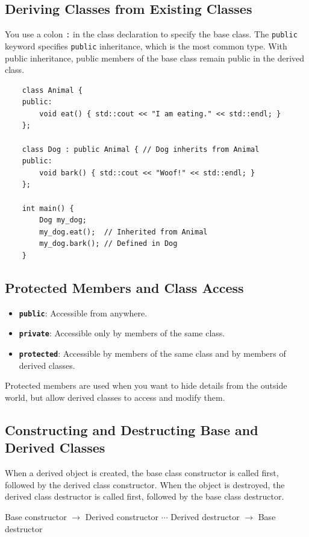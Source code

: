 \subsection{Deriving Classes from Existing Classes}
You use a colon \texttt{:} in the class declaration to specify the base class. The \texttt{public} keyword specifies \texttt{public} inheritance, which is the most common type. With public inheritance, public members of the base class remain public in the derived class.
\begin{lstlisting}
	class Animal {
	public:
		void eat() { std::cout << "I am eating." << std::endl; }
	};

	class Dog : public Animal { // Dog inherits from Animal
	public:
		void bark() { std::cout << "Woof!" << std::endl; }
	};

	int main() {
		Dog my_dog;
		my_dog.eat();  // Inherited from Animal
		my_dog.bark(); // Defined in Dog
	}
\end{lstlisting}

\subsection{Protected Members and Class Access}
\begin{itemize}
	\item \textbf{\texttt{public}}: Accessible from anywhere.
	\item \textbf{\texttt{private}}: Accessible only by members of the same class.
	\item \textbf{\texttt{protected}}: Accessible by members of the same class and by members of derived classes.
\end{itemize}
Protected members are used when you want to hide details from the outside world, but allow derived classes to access and modify them.

\subsection{Constructing and Destructing Base and Derived Classes}
When a derived object is created, the base class constructor is called first, followed by the derived class constructor. When the object is destroyed, the derived class destructor is called first, followed by the base class destructor.

\begin{center}
	Base constructor $\rightarrow$ Derived constructor $\cdots$ Derived destructor $\rightarrow$ Base destructor
\end{center}

